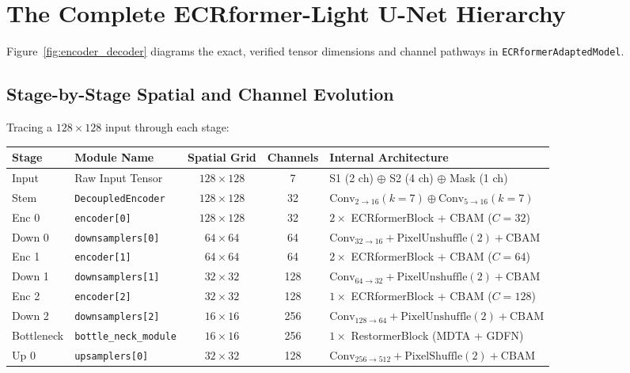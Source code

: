 \section{The Complete ECRformer-Light U-Net Hierarchy}
Figure~\ref{fig:encoder_decoder} diagrams the exact, verified tensor dimensions and channel pathways in \texttt{ECRformerAdaptedModel}.



\subsection{Stage-by-Stage Spatial and Channel Evolution}
Tracing a $128 \times 128$ input through each stage:

\begin{table}[htbp]
\centering
\small
\begin{tabularx}{\textwidth}{llccX}
\toprule
\textbf{Stage} & \textbf{Module Name} & \textbf{Spatial Grid} & \textbf{Channels} & \textbf{Internal Architecture} \\
\midrule
Input & Raw Input Tensor & $128 \times 128$ & 7 & S1 (2 ch) $\oplus$ S2 (4 ch) $\oplus$ Mask (1 ch) \\
Stem & \texttt{DecoupledEncoder} & $128 \times 128$ & 32 & $\text{Conv}_{2\to 16}(k=7) \oplus \text{Conv}_{5\to 16}(k=7)$ \\
Enc 0 & \texttt{encoder[0]} & $128 \times 128$ & 32 & $2\times$ ECRformerBlock + CBAM ($C=32$) \\
Down 0 & \texttt{downsamplers[0]} & $64 \times 64$ & 64 & $\text{Conv}_{32\to 16} + \text{PixelUnshuffle}(2) + \text{CBAM}$ \\
Enc 1 & \texttt{encoder[1]} & $64 \times 64$ & 64 & $2\times$ ECRformerBlock + CBAM ($C=64$) \\
Down 1 & \texttt{downsamplers[1]} & $32 \times 32$ & 128 & $\text{Conv}_{64\to 32} + \text{PixelUnshuffle}(2) + \text{CBAM}$ \\
Enc 2 & \texttt{encoder[2]} & $32 \times 32$ & 128 & $1\times$ ECRformerBlock + CBAM ($C=128$) \\
Down 2 & \texttt{downsamplers[2]} & $16 \times 16$ & 256 & $\text{Conv}_{128\to 64} + \text{PixelUnshuffle}(2) + \text{CBAM}$ \\
Bottleneck & \texttt{bottle\_neck\_module} & $16 \times 16$ & 256 & $1\times$ RestormerBlock (MDTA + GDFN) \\
Up 0 & \texttt{upsamplers[0]} & $32 \times 32$ & 128 & $\text{Conv}_{256\to 512} + \text{PixelShuffle}(2) + \text{CBAM}$ \\

\end{tabularx}
\end{table}
